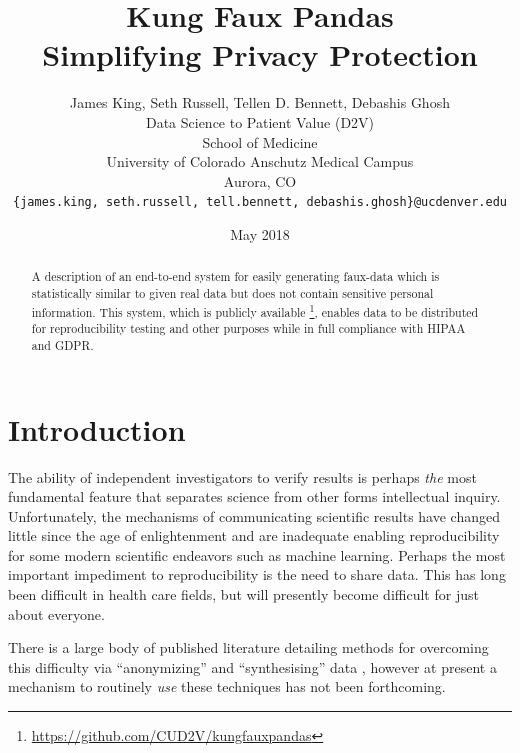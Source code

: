 \documentclass{article}
\title{%
  Kung Faux Pandas \\
  \large Simplifying Privacy Protection
  }
\author{
  James King, Seth Russell, Tellen D. Bennett, Debashis Ghosh\\
  Data Science to Patient Value (D2V)\\
  School of Medicine\\
  University of Colorado Anschutz Medical Campus\\
  Aurora, CO\\
  \texttt{\{james.king, seth.russell, tell.bennett, debashis.ghosh\}@ucdenver.edu}
  }
\date{May 2018}
\begin{document}

\maketitle

\begin{abstract}
A description of an end-to-end system for easily generating faux-data which is statistically similar to given real data but does not contain sensitive personal information.  This system, which is publicly available \footnote{\url{https://github.com/CUD2V/kungfauxpandas}}, enables data to be distributed for reproducibility testing and other purposes while in full compliance with HIPAA and GDPR.
\end{abstract}


\section{Introduction}


The ability of independent investigators to verify results is perhaps \emph{the} most fundamental feature that separates science from other forms intellectual inquiry.  Unfortunately, the mechanisms of communicating scientific results have changed little since the age of enlightenment and are inadequate enabling reproducibility for some modern scientific endeavors such as machine learning.  Perhaps the most important impediment to reproducibility is the need to share data.  This has long been difficult in health care fields, but will presently become difficult for just about everyone.

There is a large body of published literature detailing methods for overcoming this difficulty via ``anonymizing'' and ``synthesising'' data \cite{patki_synthetic_2016, choi_generating_2017}, however at present a mechanism to routinely \emph{use} these techniques has not been forthcoming.
\end{document}
